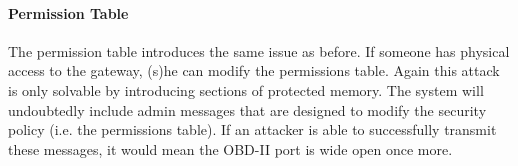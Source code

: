 \paragraph{Permission Table} The permission table introduces the same issue as before. If someone has physical access to the gateway, (s)he can modify the permissions table. Again this attack is only solvable by introducing sections of protected memory. The system will undoubtedly include admin messages that are designed to modify the security policy (i.e. the permissions table). If an attacker is able to successfully transmit these messages, it would mean the OBD-II port is wide open once more.